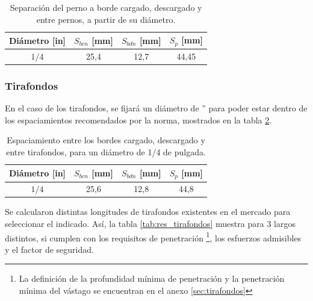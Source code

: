 \begin{table}[h]
\centering
\begin{tabular}{@{}cccc@{}}
\toprule
Diámetro [in] & $S_{bcn}$ [mm] & $S_{bdn}$ [mm] & $S_p$ [mm] \\ \midrule
$1/4$ & 25,4 & 12,7 & 44,45 \\ \bottomrule
\end{tabular}
\caption{Separación del perno a borde cargado, descargado y entre pernos, a partir de su diámetro.}
\label{tab:res_seppernos}
\end{table}

\subsubsection{Tirafondos}

En el caso de los tirafondos, se fijará un diámetro de '' para poder estar dentro de los espaciamientos recomendados por la norma, mostrados en la tabla \ref{tab:res_septirafondo}. 

\begin{table}[h]
\centering
\begin{tabular}{@{}cccc@{}}
\toprule
Diámetro [in] & $S_{bcn}$ [mm] & $S_{bdn}$ [mm] & $S_p$ [mm] \\ \midrule
$1/4$ & 25,6 & 12,8 & 44,8 \\ \bottomrule
\end{tabular}
\caption{Espaciamiento entre los bordes cargado, descargado y entre tirafondos, para un diámetro de 1/4 de pulgada.}
\label{tab:res_septirafondo}
\end{table}

Se calcularon distintas longitudes de tirafondos existentes en el mercado para seleccionar el indicado. Así, la tabla \ref{tab:res_tirafondos} muestra para 3 largos distintos, si cumplen con los requisitos de penetración \footnote{La definición de la profundidad mínima de penetración y la penetración mínima del vástago se encuentran en el anexo \ref{sec:tirafondos}}, los esfuerzos admisibles y el factor de seguridad.

